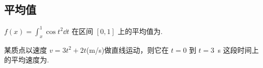 \subsection{平均值}

	\begin{ti}
		$f(x) = \int_{x}^{1} \cos t^{2} \dd{t}$ 在区间 $[0,1]$ 上的平均值为\htwo.
	\end{ti}

	\begin{ti}
		某质点以速度 $v = 3t^{2} + 2t$(\si{m/s})做直线运动，则它在 $t = 0$ 到 $t = $\SI{3}{s} 这段时间上的平均速度为\htwo.
	\end{ti}